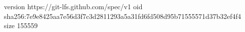 version https://git-lfs.github.com/spec/v1
oid sha256:7e9e8425aa7e56d3f7c3d2811293a5a31fd6fd508d95b71555571d37b32ef4f4
size 155559
